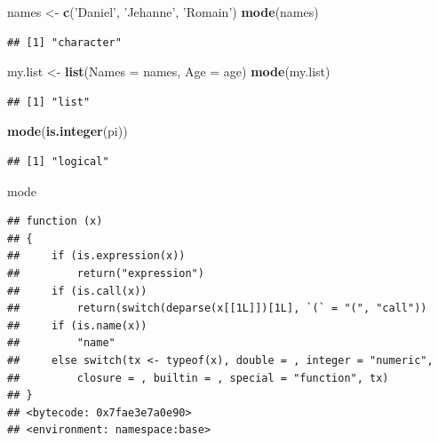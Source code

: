 \documentclass[]{book}
\newenvironment{Shaded}{\begin{snugshade}}{\end{snugshade}}
\newcommand{\DataTypeTok}[1]{\textcolor[rgb]{0.13,0.29,0.53}{#1}}
\newcommand{\KeywordTok}[1]{\textcolor[rgb]{0.13,0.29,0.53}{\textbf{#1}}}
\newcommand{\NormalTok}[1]{#1}
\newcommand{\StringTok}[1]{\textcolor[rgb]{0.31,0.60,0.02}{#1}}
\begin{document}
\begin{Shaded}
\begin{Highlighting}[]
\NormalTok{names <-}\StringTok{ }\KeywordTok{c}\NormalTok{(}\StringTok{'Daniel'}\NormalTok{, }\StringTok{'Jehanne'}\NormalTok{, }\StringTok{'Romain'}\NormalTok{)}
\KeywordTok{mode}\NormalTok{(names)}
\end{Highlighting}
\end{Shaded}

\begin{verbatim}
## [1] "character"
\end{verbatim}

\begin{Shaded}
\begin{Highlighting}[]
\NormalTok{my.list <-}\StringTok{ }\KeywordTok{list}\NormalTok{(}\DataTypeTok{Names =}\NormalTok{ names, }\DataTypeTok{Age =}\NormalTok{ age)}
\KeywordTok{mode}\NormalTok{(my.list)}
\end{Highlighting}
\end{Shaded}

\begin{verbatim}
## [1] "list"
\end{verbatim}

\begin{Shaded}
\begin{Highlighting}[]
\KeywordTok{mode}\NormalTok{(}\KeywordTok{is.integer}\NormalTok{(pi))}
\end{Highlighting}
\end{Shaded}

\begin{verbatim}
## [1] "logical"
\end{verbatim}

\begin{Shaded}
\begin{Highlighting}[]
\NormalTok{mode}
\end{Highlighting}
\end{Shaded}

\begin{verbatim}
## function (x) 
## {
##     if (is.expression(x)) 
##         return("expression")
##     if (is.call(x)) 
##         return(switch(deparse(x[[1L]])[1L], `(` = "(", "call"))
##     if (is.name(x)) 
##         "name"
##     else switch(tx <- typeof(x), double = , integer = "numeric", 
##         closure = , builtin = , special = "function", tx)
## }
## <bytecode: 0x7fae3e7a0e90>
## <environment: namespace:base>
\end{verbatim}
\end{document}
